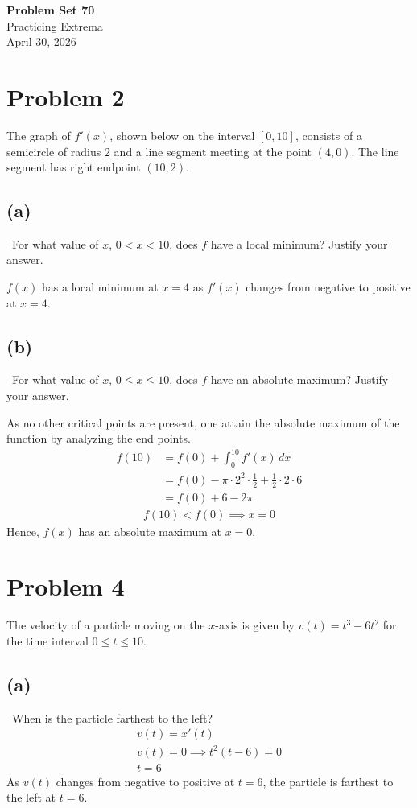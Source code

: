 \documentclass[12pt]{article}
\newcommand{\vem}{\vspace{0.5em}}
\newcommand{\problem}[1]{\section{Problem #1}}
\newcommand{\subproblem}[1]{\subsection{(#1)} \,}
\begin{document}
\vspace*{0cm}

\begin{center}
    {\Large \bfseries Problem Set 70} \\[0.5cm]
    {\large Practicing Extrema} \\[0.35cm]
    {\normalsize April 30, 2026}
\end{center}


\problem{2}
The graph of $f'(x)$, shown below on the interval $[0,10]$, consists of a semicircle of radius 2 and a line segment meeting at the point $(4,0)$. The line segment has right endpoint $(10,2)$. \vem

\subproblem{a}
For what value of $x$, $0<x<10$, does $f$ have a local minimum? Justify your answer. \vem

$f(x)$ has a local minimum at $x=4$ as $f'(x)$ changes from negative to positive at $x=4$.\vem

\subproblem{b}
For what value of $x$, $0\le x \le 10$, does $f$ have an absolute maximum? Justify your answer. \vem

As no other critical points are present, one attain the absolute maximum of the function by analyzing the end points. 
\begin{align*}
    f(10)&=f(0)+\int_0^{10}f'(x) \, dx\\
    &=f(0)-\pi\cdot 2^2\cdot\frac{1}{2}+\frac{1}{2}\cdot2\cdot6\\
    &=f(0)+6-2\pi
\end{align*}
\vspace{-2.5em}
\begin{gather*}
    f(10)<f(0) \implies \boxed{x=0}
\end{gather*}
Hence, $f(x)$ has an absolute maximum at $x=0$. \vem

\problem{4}
The velocity of a particle moving on the $x$-axis is given by $v(t)=t^3-6t^2$ for the time interval $0\le t \le 10$. \vem

\subproblem{a}
When is the particle farthest to the left?
\begin{gather*}
    v(t)=x'(t)\\
    v(t)=0 \implies t^2(t-6)=0\\
    t=6
\end{gather*}
As $v(t)$ changes from negative to positive at $t=6$, the particle is farthest to the left at $t=6.$ \vspace{0.5em}
\end{document}
